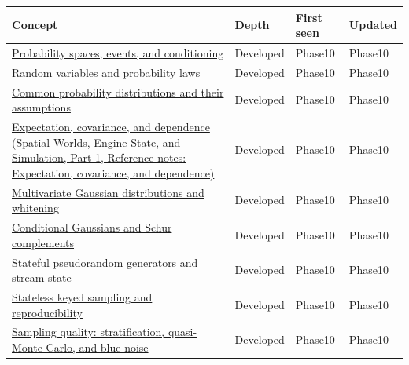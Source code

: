 {\def\LTcaptype{none} %
\begin{longtable}[]{@{}
  >{\raggedright\arraybackslash}p{}
  >{\raggedright\arraybackslash}p{}
  >{\raggedright\arraybackslash}p{}
  >{\raggedright\arraybackslash}p{}@{}}
\toprule\noalign{}
\begin{minipage}[b]{\linewidth}\raggedright
Concept
\end{minipage} & \begin{minipage}[b]{\linewidth}\raggedright
Depth
\end{minipage} & \begin{minipage}[b]{\linewidth}\raggedright
First seen
\end{minipage} & \begin{minipage}[b]{\linewidth}\raggedright
Updated
\end{minipage} \\
\midrule\noalign{}
\endhead
\bottomrule\noalign{}
\endlastfoot
\hyperref[appendix-f1ef323f6ed7]{Probability spaces, events, and conditioning} & Developed & Phase10 & Phase10 \\
\hyperref[appendix-4d0203f7944f]{Random variables and probability laws} & Developed & Phase10 & Phase10 \\
\hyperref[appendix-a2360b435383]{Common probability distributions and their assumptions} & Developed & Phase10 & Phase10 \\
\href{../05-Spatial-Worlds-Engine-State-and-Simulation-P01/main.pdf\#appendix-54c383df9992}{Expectation, covariance, and dependence (Spatial Worlds, Engine State, and Simulation, Part 1, Reference notes: Expectation, covariance, and dependence)} & Developed & Phase10 & Phase10 \\
\hyperref[appendix-12bbe185dbe5]{Multivariate Gaussian distributions and whitening} & Developed & Phase10 & Phase10 \\
\hyperref[appendix-f0437ea55a47]{Conditional Gaussians and Schur complements} & Developed & Phase10 & Phase10 \\
\hyperref[appendix-e0f7c7e08f3a]{Stateful pseudorandom generators and stream state} & Developed & Phase10 & Phase10 \\
\hyperref[appendix-daaf25bfd3a0]{Stateless keyed sampling and reproducibility} & Developed & Phase10 & Phase10 \\
\hyperref[appendix-9f693ffd82bc]{Sampling quality: stratification, quasi-Monte Carlo, and blue noise} & Developed & Phase10 & Phase10 \\

\end{longtable}}
